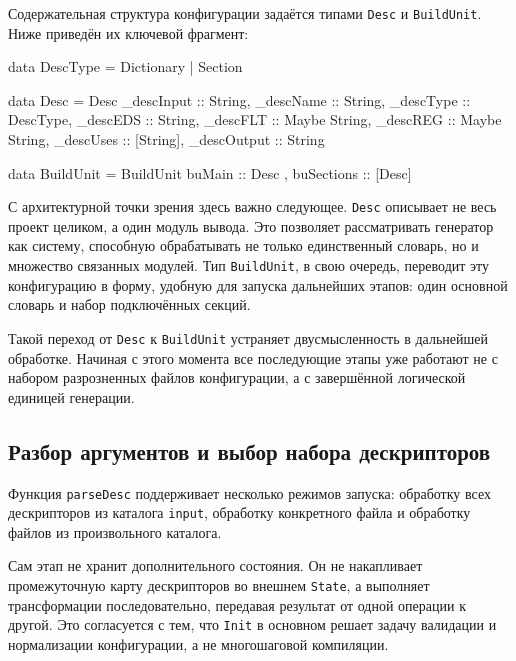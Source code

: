 \documentclass[a4paper,12pt]{article}
\begin{document}
Содержательная структура конфигурации задаётся типами \texttt{Desc} и \texttt{BuildUnit}.
Ниже приведён их ключевой фрагмент:

\begin{flushleft}
\label{lst:init-types}
\begin{MyCodes}
data DescType
  = Dictionary
  | Section

data Desc = Desc {
      _descInput  :: String,
      _descName   :: String,
      _descType   :: DescType,
      _descEDS    :: String,
      _descFLT    :: Maybe String,
      _descREG    :: Maybe String,
      _descUses   :: [String],
      _descOutput :: String
    }

data BuildUnit = BuildUnit
  { buMain     :: Desc
  , buSections :: [Desc]
  }
\end{MyCodes}
\end{flushleft}

С архитектурной точки зрения здесь важно следующее. \texttt{Desc} описывает не весь проект целиком, а
один модуль вывода. Это позволяет рассматривать генератор как систему, способную
обрабатывать не только единственный словарь, но и множество связанных модулей. Тип
\texttt{BuildUnit}, в свою очередь, переводит эту конфигурацию в форму, удобную для
запуска дальнейших этапов: один основной словарь и набор подключённых секций.

Такой переход от \texttt{Desc} к \texttt{BuildUnit} устраняет двусмысленность в
дальнейшей обработке. Начиная с этого момента все последующие этапы уже работают не с
набором разрозненных файлов конфигурации, а с завершённой логической единицей генерации.

\subsection{Разбор аргументов и выбор набора дескрипторов}

Функция \texttt{parseDesc} поддерживает несколько режимов запуска: обработку всех
дескрипторов из каталога \texttt{input}, обработку конкретного файла и обработку файлов
из произвольного каталога.

Сам этап не хранит дополнительного состояния. Он не накапливает промежуточную
карту дескрипторов во внешнем \texttt{State}, а выполняет трансформации последовательно,
передавая результат от одной операции к другой. Это согласуется с тем, что
\texttt{Init} в основном решает задачу валидации и нормализации конфигурации, а не
многошаговой компиляции.
\end{document}
